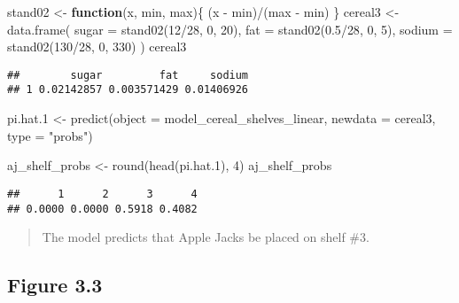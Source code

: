 \documentclass[
  11pt,
]{article}
\newenvironment{Shaded}{\begin{snugshade}}{\end{snugshade}}
\newcommand{\AttributeTok}[1]{\textcolor[rgb]{0.77,0.63,0.00}{#1}}
\newcommand{\ControlFlowTok}[1]{\textcolor[rgb]{0.13,0.29,0.53}{\textbf{#1}}}
\newcommand{\DecValTok}[1]{\textcolor[rgb]{0.00,0.00,0.81}{#1}}
\newcommand{\FloatTok}[1]{\textcolor[rgb]{0.00,0.00,0.81}{#1}}
\newcommand{\FunctionTok}[1]{\textcolor[rgb]{0.00,0.00,0.00}{#1}}
\newcommand{\NormalTok}[1]{#1}
\newcommand{\OtherTok}[1]{\textcolor[rgb]{0.56,0.35,0.01}{#1}}
\newcommand{\SpecialCharTok}[1]{\textcolor[rgb]{0.00,0.00,0.00}{#1}}
\newcommand{\StringTok}[1]{\textcolor[rgb]{0.31,0.60,0.02}{#1}}
\begin{document}
\begin{Shaded}
\begin{Highlighting}[]
\NormalTok{stand02 }\OtherTok{\textless{}{-}} \ControlFlowTok{function}\NormalTok{(x, min, max)\{}
\NormalTok{  (x }\SpecialCharTok{{-}}\NormalTok{ min)}\SpecialCharTok{/}\NormalTok{(max }\SpecialCharTok{{-}}\NormalTok{ min)}
\NormalTok{\}}
\NormalTok{cereal3 }\OtherTok{\textless{}{-}} \FunctionTok{data.frame}\NormalTok{(}
  \AttributeTok{sugar =} \FunctionTok{stand02}\NormalTok{(}\DecValTok{12}\SpecialCharTok{/}\DecValTok{28}\NormalTok{, }\DecValTok{0}\NormalTok{, }\DecValTok{20}\NormalTok{),}
  \AttributeTok{fat =} \FunctionTok{stand02}\NormalTok{(}\FloatTok{0.5}\SpecialCharTok{/}\DecValTok{28}\NormalTok{, }\DecValTok{0}\NormalTok{, }\DecValTok{5}\NormalTok{),}
  \AttributeTok{sodium =} \FunctionTok{stand02}\NormalTok{(}\DecValTok{130}\SpecialCharTok{/}\DecValTok{28}\NormalTok{, }\DecValTok{0}\NormalTok{, }\DecValTok{330}\NormalTok{)}
\NormalTok{)}
\NormalTok{cereal3}
\end{Highlighting}
\end{Shaded}

\begin{verbatim}
##        sugar         fat     sodium
## 1 0.02142857 0.003571429 0.01406926
\end{verbatim}

\begin{Shaded}
\begin{Highlighting}[]
\NormalTok{pi.hat}\FloatTok{.1} \OtherTok{\textless{}{-}} \FunctionTok{predict}\NormalTok{(}\AttributeTok{object =}\NormalTok{ model\_cereal\_shelves\_linear, }\AttributeTok{newdata =}\NormalTok{ cereal3, }\AttributeTok{type =} \StringTok{"probs"}\NormalTok{)}

\NormalTok{aj\_shelf\_probs }\OtherTok{\textless{}{-}} \FunctionTok{round}\NormalTok{(}\FunctionTok{head}\NormalTok{(pi.hat}\FloatTok{.1}\NormalTok{), }\DecValTok{4}\NormalTok{)}
\NormalTok{aj\_shelf\_probs}
\end{Highlighting}
\end{Shaded}

\begin{verbatim}
##      1      2      3      4 
## 0.0000 0.0000 0.5918 0.4082
\end{verbatim}

\begin{quote}
The model predicts that Apple Jacks be placed on shelf \#3.
\end{quote}

\hypertarget{figure-3.3}{%
\subsection{Figure 3.3}\label{figure-3.3}}
\end{document}
